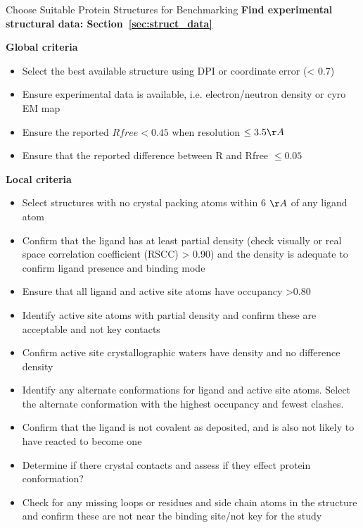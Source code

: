 \documentclass[9pt,bestpractices]{livecoms}
\begin{document}
\begin{Checklists*}

\begin{checklist}{Choose Suitable Protein Structures for Benchmarking}
\textbf{Find experimental structural data: Section~\ref{sec:struct_data}}

    \textbf{Global criteria}
    \begin{itemize}
        \item Select the best available structure using DPI or coordinate error (< 0.7)
        \item Ensure experimental data is available, i.e. electron/neutron density or cyro EM map
        \item Ensure the reported $Rfree < 0.45$ when resolution $\le 3.5 \AA$
        \item Ensure that the reported difference between R and Rfree $\le 0.05$
        \end{itemize}
    \textbf{Local criteria}
    \begin{itemize}
        \item Select structures with no crystal packing atoms within 6 $\AA$ of any ligand atom 
        \item Confirm that the ligand has at least partial density (check visually or real space correlation coefficient (RSCC) > 0.90) and the density is adequate to confirm ligand presence and binding mode
        \item Ensure that all ligand and active site atoms have occupancy >0.80
        \item Identify active site atoms with partial density and confirm these are acceptable and not key contacts
        \item Confirm active site crystallographic waters have density and no difference density
        \item Identify any alternate conformations for ligand and active site atoms. Select the alternate conformation with the highest occupancy and fewest clashes. 
        \item Confirm that the ligand is not covalent as deposited, and is also not likely to have reacted to become one
        \item Determine if there crystal contacts and assess if they effect protein conformation? 
        \item Check for any missing loops or residues and side chain atoms in the structure and confirm these are not near the binding site/not key for the study
    \end{itemize}

\end{checklist}
\end{Checklists*}
\end{document}
